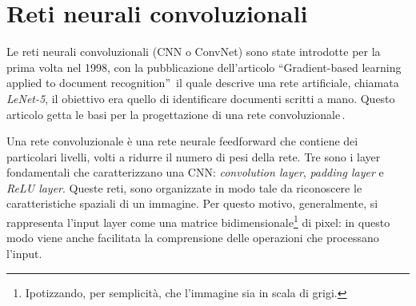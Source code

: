 \section{Reti neurali convoluzionali}
% 
Le reti neurali convoluzionali (\acs{CNN} o \acs{ConvNet}) sono state introdotte per la prima volta nel 1998, con la pubblicazione dell'articolo ``Gradient-based learning applied to document recognition''\,\cite{lecun1998gradient} il quale descrive una rete artificiale, chiamata \textit{LeNet-5}, il obiettivo era quello di identificare documenti scritti a mano. Questo articolo getta le basi per la progettazione di una rete convoluzionale\,\cite{aggarwal2018neural}.

Una rete convoluzionale è una rete neurale feedforward che contiene dei particolari livelli, volti a ridurre il numero di pesi della rete. Tre sono i layer fondamentali che caratterizzano una \acs{CNN}: \textit{convolution layer}, \textit{padding layer} e \textit{\acs{ReLU} layer}. Queste reti, sono organizzate in modo tale da riconoscere le caratteristiche spaziali di un immagine. Per questo motivo, generalmente, si rappresenta l'input layer come una matrice bidimensionale\footnote{Ipotizzando, per semplicità, che l'immagine sia in scala di grigi.} di pixel: in questo modo viene anche facilitata la comprensione delle operazioni che processano l'input.

